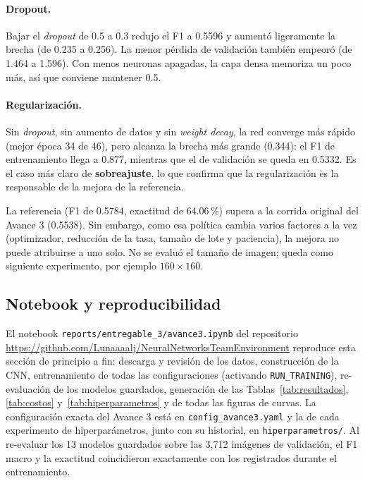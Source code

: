 \paragraph{Dropout.} Bajar el \textit{dropout} de 0.5 a 0.3 redujo el F1 a 0.5596 y aumentó ligeramente la brecha (de 0.235 a 0.256). La menor pérdida de validación también empeoró (de 1.464 a 1.596). Con menos neuronas apagadas, la capa densa memoriza un poco más, así que conviene mantener 0.5.

\paragraph{Regularización.} Sin \textit{dropout}, sin aumento de datos y sin \textit{weight decay}, la red converge más rápido (mejor época 34 de 46), pero alcanza la brecha más grande (0.344): el F1 de entrenamiento llega a 0.877, mientras que el de validación se queda en 0.5332. Es el caso más claro de \textbf{sobreajuste}, lo que confirma que la regularización es la responsable de la mejora de la referencia.

La referencia (F1 de 0.5784, exactitud de 64.06\,\%) supera a la corrida original del Avance 3 (0.5538). Sin embargo, como esa política cambia varios factores a la vez (optimizador, reducción de la tasa, tamaño de lote y paciencia), la mejora no puede atribuirse a uno solo. No se evaluó el tamaño de imagen; queda como siguiente experimento, por ejemplo $160\times160$.

\subsection{Notebook y reproducibilidad}
\label{sec:notebook}
El notebook \texttt{reports/entregable\_3/avance3.ipynb} del repositorio \url{https://github.com/Lunaaaalj/NeuralNetworksTeamEnvironment} reproduce esta sección de principio a fin: descarga y revisión de los datos, construcción de la CNN, entrenamiento de todas las configuraciones (activando \texttt{RUN\_TRAINING}), re-evaluación de los modelos guardados, generación de las Tablas~\ref{tab:resultados}, \ref{tab:costos} y~\ref{tab:hiperparametros} y de todas las figuras de curvas. La configuración exacta del Avance 3 está en \texttt{config\_avance3.yaml} y la de cada experimento de hiperparámetros, junto con su historial, en \texttt{hiperparametros/}. Al re-evaluar los 13 modelos guardados sobre las 3,712 imágenes de validación, el F1 macro y la exactitud coincidieron exactamente con los registrados durante el entrenamiento.

